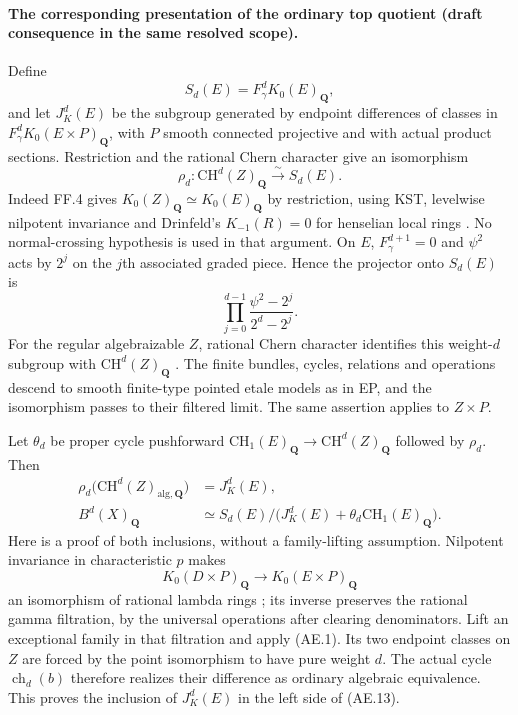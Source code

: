 \paragraph{The corresponding presentation of the ordinary top quotient
(draft consequence in the same resolved scope).}
Define
\[
 S_d(E)=F_\gamma^dK_0(E)_{\mathbf Q},
\]
and let $J_K^d(E)$ be the subgroup generated by endpoint differences
of classes in $F_\gamma^dK_0(E\times P)_{\mathbf Q}$, with $P$
smooth connected projective and with actual product sections.
Restriction and the rational Chern character give an isomorphism
\begin{equation}
         \rho_d:\mathrm{CH}^d(Z)_{\mathbf Q}
                         \xrightarrow{\sim}S_d(E).     \tag{AE.11}
\end{equation}
Indeed FF.4 gives $K_0(Z)_{\mathbf Q}\simeq K_0(E)_{\mathbf Q}$
by restriction, using KST, levelwise nilpotent invariance and
Drinfeld's $K_{-1}(R)=0$ for henselian local rings
\citep[Theorem 3.7 and Remark (ii), p.~8]{frDrinfeld2004Tate}.
No normal-crossing hypothesis is used in that argument.
On $E$, $F_\gamma^{d+1}=0$ and $\psi^2$ acts by $2^j$ on
the $j$th associated graded piece.  Hence the projector onto
$S_d(E)$ is
\begin{equation}
       \prod_{j=0}^{d-1}
                \frac{\psi^2-2^j}{2^d-2^j}.           \tag{AE.12}
\end{equation}
For the regular algebraizable $Z$, rational Chern character
identifies this weight-$d$ subgroup with $\mathrm{CH}^d(Z)_{\mathbf Q}$
\citep[Chapter II, Proposition 4.9 and Corollary 8.9.1]
{D_Weibel2013KbookII}.  The finite bundles, cycles, relations
and operations descend to smooth finite-type pointed etale
models as in EP, and the isomorphism passes to their filtered
limit.  The same assertion applies to $Z\times P$.

Let $\theta_d$ be proper cycle pushforward
$\mathrm{CH}_1(E)_{\mathbf Q}\to\mathrm{CH}^d(Z)_{\mathbf Q}$
followed by $\rho_d$.  Then
\begin{align}
 \rho_d\bigl(\mathrm{CH}^d(Z)_{\mathrm{alg},\mathbf Q}\bigr)
       &=J_K^d(E),                                     \tag{AE.13}\\
 B^d(X)_{\mathbf Q}
       &\simeq S_d(E)\big/
           \bigl(J_K^d(E)+\theta_d\mathrm{CH}_1(E)_{\mathbf Q}\bigr).
                                                        \tag{AE.14}
\end{align}
Here is a proof of both inclusions, without a family-lifting
assumption.  Nilpotent invariance in characteristic $p$ makes
\[
 K_0(D\times P)_{\mathbf Q}\longrightarrow K_0(E\times P)_{\mathbf Q}
\]
an isomorphism of rational lambda rings
\citep[Theorem A]{rootGeisserHesselholt2011}; its inverse preserves
the rational gamma filtration, by the universal operations after
clearing denominators.  Lift an exceptional family in that
filtration and apply (AE.1).  Its two endpoint classes on $Z$
are forced by the point isomorphism to have pure weight $d$.
The actual cycle $\operatorname{ch}_d(b)$ therefore realizes
their difference as ordinary algebraic equivalence.  This proves
the inclusion of $J_K^d(E)$ in the left side of (AE.13).

